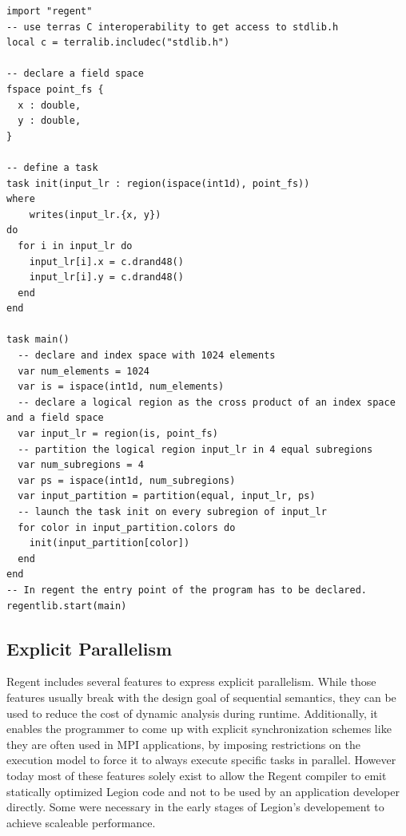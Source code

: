 \documentclass{article}      %
\begin{document}
\lstset{
	captionpos=b,
	style=regent,
	basicstyle=\scriptsize,
	numbers=left,
	numberstyle=\tiny,
	columns=fullflexible,
	stepnumber=1,
}
\begin{lstlisting}[frame=single,label={lst:regent_example},
	caption={A simple example of Regent's syntax}]
import "regent"
-- use terras C interoperability to get access to stdlib.h
local c = terralib.includec("stdlib.h")

-- declare a field space
fspace point_fs {
  x : double,
  y : double,
}

-- define a task
task init(input_lr : region(ispace(int1d), point_fs))
where 
	writes(input_lr.{x, y}) 
do
  for i in input_lr do
    input_lr[i].x = c.drand48()
    input_lr[i].y = c.drand48()
  end
end

task main()
  -- declare and index space with 1024 elements
  var num_elements = 1024 
  var is = ispace(int1d, num_elements)
  -- declare a logical region as the cross product of an index space and a field space
  var input_lr = region(is, point_fs)
  -- partition the logical region input_lr in 4 equal subregions
  var num_subregions = 4
  var ps = ispace(int1d, num_subregions)
  var input_partition = partition(equal, input_lr, ps)
  -- launch the task init on every subregion of input_lr
  for color in input_partition.colors do
  	init(input_partition[color])
  end
end
-- In regent the entry point of the program has to be declared.
regentlib.start(main)
\end{lstlisting}



\subsection{Explicit Parallelism}
Regent includes several features to express explicit parallelism. While those features usually break with the design goal of sequential semantics, they can be used to reduce the cost of dynamic analysis during runtime. Additionally, it enables the programmer to come up with explicit synchronization schemes like they are often used in MPI applications, by imposing restrictions on the execution model to force it to always execute specific tasks in parallel.
However today most of these features solely exist to allow the Regent compiler to emit statically optimized Legion code and not to be used by an application developer directly. Some were necessary in the early stages of Legion's developement to achieve scaleable performance. 
\end{document}

